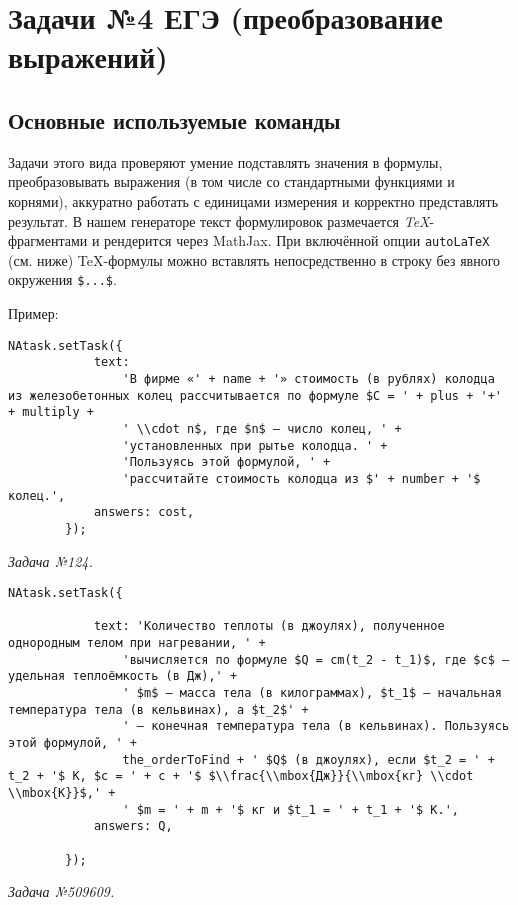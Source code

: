\section{Задачи №4 ЕГЭ (преобразование выражений)}

\subsection{Основные используемые команды}

Задачи этого вида проверяют умение подставлять значения в формулы, преобразовывать выражения (в том числе со стандартными функциями и корнями), аккуратно работать с единицами измерения и корректно представлять результат. 
В нашем генераторе текст формулировок размечается \emph{TeX}-фрагментами и рендерится через MathJax. 
При включённой опции \verb|autoLaTeX| (см. ниже) TeX-формулы можно вставлять непосредственно в строку без явного окружения \verb|$...$|.

Пример:
\begin{lstlisting}
NAtask.setTask({
			text:
				'В фирме «' + name + '» стоимость (в рублях) колодца из железобетонных колец рассчитывается по формуле $C = ' + plus + '+' + multiply + 
				' \\cdot n$, где $n$ – число колец, ' +
				'установленных при рытье колодца. ' +
				'Пользуясь этой формулой, ' +
				'рассчитайте стоимость колодца из $' + number + '$ колец.',
			answers: cost,
		});
\end{lstlisting}
\textsl{Задача №124.}

 

\begin{lstlisting}
NAtask.setTask({

			text: 'Количество теплоты (в джоулях), полученное однородным телом при нагревании, ' +
				'вычисляется по формуле $Q = cm(t_2 - t_1)$, где $c$ – удельная теплоёмкость (в Дж),' +
				' $m$ – масса тела (в килограммах), $t_1$ – начальная температура тела (в кельвинах), а $t_2$' +
				' – конечная температура тела (в кельвинах). Пользуясь этой формулой, ' +
				the_orderToFind + ' $Q$ (в джоулях), если $t_2 = ' + t_2 + '$ К, $c = ' + c + '$ $\\frac{\\mbox{Дж}}{\\mbox{кг} \\cdot \\mbox{К}}$,' +
				' $m = ' + m + '$ кг и $t_1 = ' + t_1 + '$ К.',
			answers: Q,

		});
\end{lstlisting}
\textsl{Задача №509609.}

